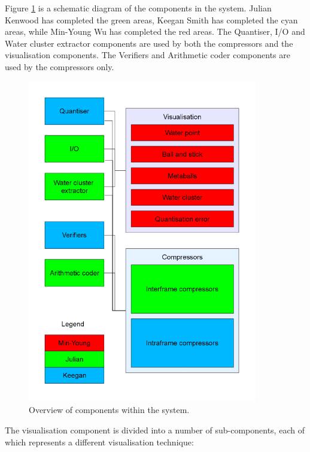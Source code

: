 Figure \ref{fig:design_overview} is a schematic diagram of the components in
the system. Julian Kenwood has completed the green areas, Keegan Smith has
completed the cyan areas, while Min-Young Wu has completed the red areas. The
Quantiser, I/O and Water cluster extractor components are used by both the
compressors and the visualisation components. The Verifiers and Arithmetic
coder components are used by the compressors only.

\begin{figure}
  \begin{center}
    \includegraphics[width=100mm]{breakdown}
  \end{center}
  \caption{Overview of components within the system.}
  \label{fig:design_overview}
\end{figure}



The visualisation component is divided into a number of sub-components, each of
which represents a different visualisation technique:

